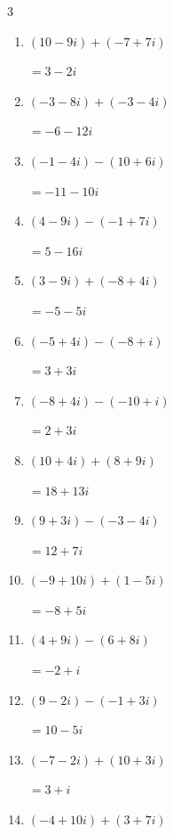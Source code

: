 \begin{multicols}{3}
\begin{enumerate}
        $\displaystyle =-4-2i$

  \item $\displaystyle (10-9i) + (-7+7i)$

        $\displaystyle =3-2i$

  \item $\displaystyle (-3-8i) + (-3-4i)$

        $\displaystyle =-6-12i$

  \item $\displaystyle (-1-4i) - (10+6i)$

        $\displaystyle =-11-10i$

  \item $\displaystyle (4-9i) - (-1+7i)$

        $\displaystyle =5-16i$

  \item $\displaystyle (3-9i) + (-8+4i)$

        $\displaystyle =-5-5i$

  \item $\displaystyle (-5+4i) - (-8+i)$

        $\displaystyle =3+3i$

  \item $\displaystyle (-8+4i) - (-10+i)$

        $\displaystyle =2+3i$

  \item $\displaystyle (10+4i) + (8+9i)$

        $\displaystyle =18+13i$

  \item $\displaystyle (9+3i) - (-3-4i)$

        $\displaystyle =12+7i$

  \item $\displaystyle (-9+10i) + (1-5i)$

        $\displaystyle =-8+5i$

  \item $\displaystyle (4+9i) - (6+8i)$

        $\displaystyle =-2+i$

  \item $\displaystyle (9-2i) - (-1+3i)$

        $\displaystyle =10-5i$

  \item $\displaystyle (-7-2i) + (10+3i)$

        $\displaystyle =3+i$

  \item $\displaystyle (-4+10i) + (3+7i)$


\end{enumerate}
\end{multicols}

